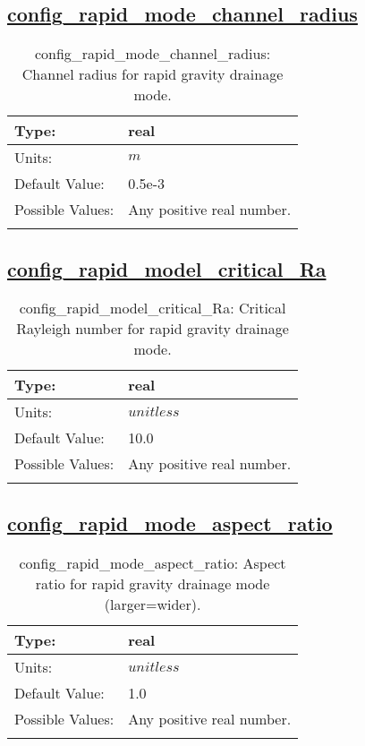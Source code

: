 \subsection[config\_rapid\_mode\_channel\_radius]{\hyperref[sec:nm_tab_thermodynamics]{config\_rapid\_mode\_channel\_radius}}
\label{subsec:nm_sec_config_rapid_mode_channel_radius}
\begin{center}
\begin{longtable}{| p{2.0in} || p{4.0in} |}
    \hline
    Type: & real \\
    \hline
    Units: & $m$ \\
    \hline
    Default Value: & 0.5e-3 \\
    \hline
    Possible Values: & Any positive real number. \\
    \hline
    \caption{config\_rapid\_mode\_channel\_radius: Channel radius for rapid gravity drainage mode.}
\end{longtable}
\end{center}
\subsection[config\_rapid\_model\_critical\_Ra]{\hyperref[sec:nm_tab_thermodynamics]{config\_rapid\_model\_critical\_Ra}}
\label{subsec:nm_sec_config_rapid_model_critical_Ra}
\begin{center}
\begin{longtable}{| p{2.0in} || p{4.0in} |}
    \hline
    Type: & real \\
    \hline
    Units: & $unitless$ \\
    \hline
    Default Value: & 10.0 \\
    \hline
    Possible Values: & Any positive real number. \\
    \hline
    \caption{config\_rapid\_model\_critical\_Ra: Critical Rayleigh number for rapid gravity drainage mode.}
\end{longtable}
\end{center}
\subsection[config\_rapid\_mode\_aspect\_ratio]{\hyperref[sec:nm_tab_thermodynamics]{config\_rapid\_mode\_aspect\_ratio}}
\label{subsec:nm_sec_config_rapid_mode_aspect_ratio}
\begin{center}
\begin{longtable}{| p{2.0in} || p{4.0in} |}
    \hline
    Type: & real \\
    \hline
    Units: & $unitless$ \\
    \hline
    Default Value: & 1.0 \\
    \hline
    Possible Values: & Any positive real number. \\
    \hline
    \caption{config\_rapid\_mode\_aspect\_ratio: Aspect ratio for rapid gravity drainage mode (larger=wider).}
\end{longtable}
\end{center}
